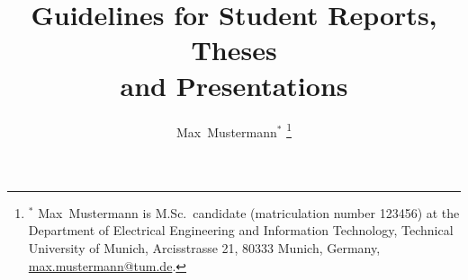 \documentclass[journal]{IEEEtran}
\begin{document}
\title{Guidelines for Student Reports, Theses\\ and Presentations}

\author{%
Max~Mustermann$^*$%
\thanks{$^*$ Max~Mustermann is M.Sc.\ candidate (matriculation number 123456) at the Department of Electrical Engineering and Information Technology, Technical University of Munich, Arcisstrasse 21, 80333 Munich, Germany, \url{max.mustermann@tum.de}.}
%
}%


\end{document}
